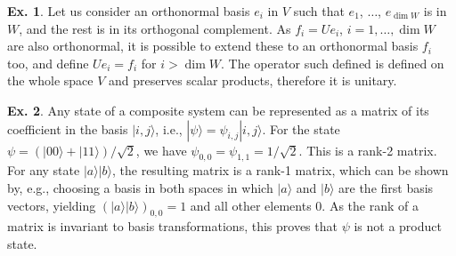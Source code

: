 \documentclass[a4paper,12pt]{article}
\theoremstyle{definition}
\newtheorem{exercise}{Ex.}[section]
\begin{document}
\begin{exercise}
 Let us consider an orthonormal basis $e_i$ in $V$ such that $e_1$, $\dots$, $e_{\dim W}$ is in $W$, and the rest is in its orthogonal complement. As $f_i=Ue_i$, $i=1,\dots,\dim W$ are also orthonormal, it is possible to extend these to an orthonormal basis $f_i$ too, and define $Ue_i = f_i$ for $i>\dim W$. The operator such defined is defined on the whole space $V$ and preserves scalar products, therefore it is unitary.
\end{exercise}

\begin{exercise}
 Any state of a composite system can be represented as a matrix of its coefficient in the basis $|i, j\rangle$, i.e., $|\psi\rangle = \psi_{i,j}|i, j\rangle$. For the state $\psi = (|00\rangle + |11\rangle)/\sqrt{2}$, we have $\psi_{0,0} = \psi_{1,1}=1/\sqrt{2}$. This is a rank-2 matrix. For any state $|a\rangle|b\rangle$, the resulting matrix is a rank-1 matrix, which can be shown by, e.g., choosing a basis in both spaces in which $|a\rangle$ and $|b\rangle$ are the first basis vectors, yielding $(|a\rangle|b\rangle)_{0,0}=1$ and all other elements 0. As the rank of a matrix is invariant to basis transformations, this proves that $\psi$ is not a product state.
\end{exercise}
\end{document}
